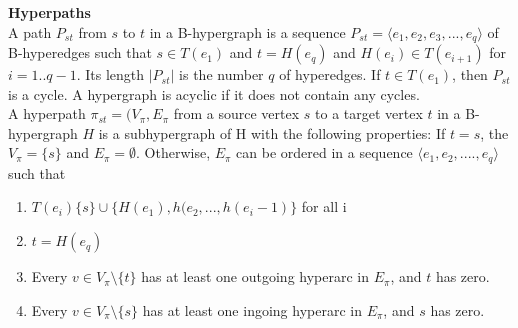\documentclass[a4paper,10pt,titlepage]{paper}
\begin{document}
\textbf{Hyperpaths}\\
A path $P_{st}$ from $s$ to $t$ in a B-hypergraph is a sequence $P_{st}=\langle e_1, e_2, e_3, ... , e_q \rangle$ of B-hyperedges such that $s\in T(e_1)$ and $t=H(e_q)$ and $H(e_i) \in T(e_{i+1})$ for $i=1..q-1$. Its length $|P_{st}|$ is the number $q$ of hyperedges. If $t \in T(e_1)$, then $P_{st}$ is a cycle. A hypergraph is acyclic if it does not contain any cycles. \cite{Fagerberg} \\
A hyperpath $\pi_{st} = (V_{\pi},E_{\pi}$ from a source vertex $s$ to a target vertex $t$ in a B-hypergraph $H$ is a subhypergraph of H with the following properties: If $t = s$, the $V_{\pi}=\{s\}$ and $E_{\pi} = \emptyset$. Otherwise, $E_{\pi}$ can be ordered in a sequence $\langle e_1, e_2,....,e_q \rangle$ such that 
\begin{enumerate}
\item 
$T(e_i)\{s\} \cup \{H(e_1),h(e_2,...,h(e_i-1)\}$ for all i
\item
$t=H(e_q)$
\item
Every $v \in V_{\pi} \setminus \{t\} $ has at least one outgoing hyperarc in $E_{\pi}$, and $t$ has zero.
\item
Every $v \in V_{\pi} \setminus \{s\}$ has at least one ingoing hyperarc in $E_{\pi}$, and $s$ has zero. \cite{Fagerberg}
\end{enumerate}
\end{document}
